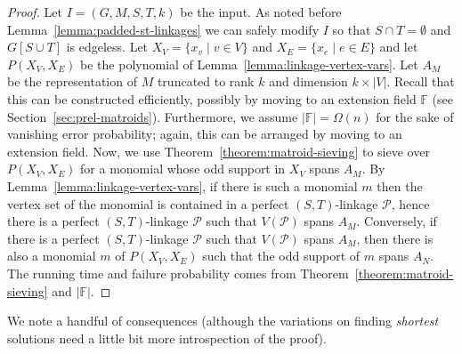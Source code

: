 \documentclass{theoretics}
\newcommand{\F}{\ensuremath{\mathbb F}\xspace}
\newcommand{\cP}{\ensuremath{\mathcal P}\xspace}
\begin{document}
\begin{proof} 
  Let $I=(G, M, S, T, k)$ be the input. As noted before Lemma~\ref{lemma:padded-st-linkages}
  we can safely modify $I$ so that $S \cap T = \emptyset$
  and $G[S \cup T]$ is edgeless. 
  Let $X_V=\{x_v \mid v \in V\}$ and $X_E=\{x_e \mid e \in E\}$
  and let $P(X_V,X_E)$ be the polynomial of Lemma~\ref{lemma:linkage-vertex-vars}.
  Let $A_M$ be the representation of $M$ truncated to rank $k$
  and dimension $k \times |V|$. 
  Recall that this can be constructed efficiently, possibly by moving
  to an extension field $\F$ (see Section~\ref{sec:prel-matroids}). 
  Furthermore, we assume $|\F| = \Omega(n)$ for the sake of vanishing
  error probability; again, this can be arranged by moving to an
  extension field. Now, we use Theorem~\ref{theorem:matroid-sieving} to
  sieve over $P(X_V,X_E)$ for a monomial whose odd support in $X_V$
  spans $A_M$. By Lemma~\ref{lemma:linkage-vertex-vars}, if
  there is such a monomial $m$ then the vertex set of the monomial is
  contained in a perfect $(S,T)$-linkage $\cP$, hence there is a
  perfect $(S,T)$-linkage $\cP$ such that $V(\cP)$ spans $A_M$.
  Conversely, if there is a perfect $(S,T)$-linkage $\cP$ such that
  $V(\cP)$ spans $A_M$, then there is also a monomial $m$ of
  $P(X_V,X_E)$ such that the odd support of $m$ spans $A_N$.
  The running time and failure probability comes from
  Theorem~\ref{theorem:matroid-sieving} and $|\F|$. 
\end{proof}

We note a handful of consequences (although the variations on finding 
\emph{shortest} solutions need a little bit more introspection of the proof).
\end{document}
